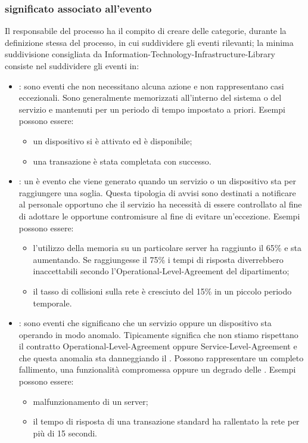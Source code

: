 \subsubsection[Significato associato all'evento]{significato associato all'evento}
Il responsabile del processo ha il compito di creare delle categorie, durante la definizione stessa del processo, in cui suddividere gli eventi rilevanti; la minima suddivisione consigliata da \ac{Information-Technology-Infrastructure-Library} consiste nel suddividere gli eventi in:

\begin{itemize}
\item{: sono eventi che non necessitano alcuna azione e non rappresentano casi eccezionali. Sono generalmente memorizzati all'interno del sistema o del servizio e mantenuti per un periodo di tempo impostato a priori. Esempi possono essere:}
\begin{itemize}
\item{un dispositivo si è attivato ed è disponibile;}
\item{una transazione è stata completata con successo.}
\end{itemize}
\item{: un  è evento che viene generato quando un servizio o un dispositivo sta per raggiungere una soglia. Questa tipologia di avvisi sono destinati a notificare al personale opportuno che il servizio ha necessità di essere controllato al fine di adottare le opportune contromisure al fine di evitare un'eccezione. Esempi possono essere:}
\begin{itemize}
\item{l'utilizzo della memoria su un particolare server ha raggiunto il 65\% e sta aumentando. Se raggiungesse il 75\% i tempi di risposta diverrebbero inaccettabili secondo l'\ac{Operational-Level-Agreement} del dipartimento;}
\item{il tasso di collisioni sulla rete è cresciuto del 15\% in un piccolo periodo temporale.}
\end{itemize}
\item{: sono eventi che significano che un servizio oppure un dispositivo sta operando in modo anomalo. Tipicamente significa che non stiamo rispettano il contratto \ac{Operational-Level-Agreement} oppure \ac{Service-Level-Agreement} e che questa anomalia sta danneggiando il . Possono rappresentare un completo fallimento, una funzionalità compromessa oppure un degrado delle . Esempi possono essere:}
\begin{itemize}
\item{malfunzionamento di un server;}
\item{il tempo di risposta di una transazione standard ha rallentato la rete per più di 15 secondi.}
\end{itemize}
\end{itemize}

